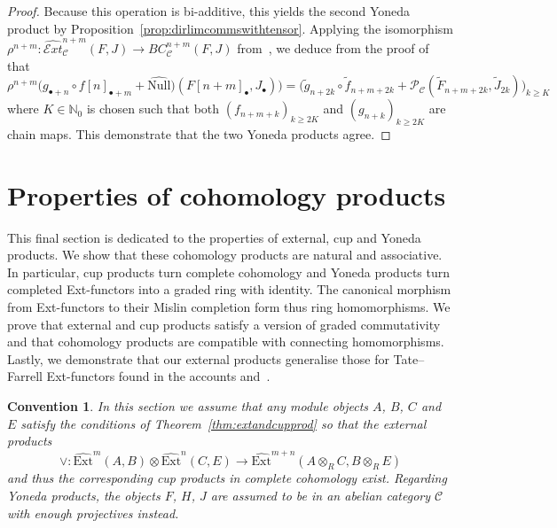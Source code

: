 \documentclass[12pt, a4paper]{article}
\numberwithin{equation}{section}
\newtheorem{conv}[thm]{Convention}
\theoremstyle{empty}
\theoremstyle{nonumberplain}
\newtheorem{proof}{Proof}
\begin{document}
\begin{proof}
Because this operation is bi-additive, this yields the second Yoneda product by Proposition~\ref{prop:dirlimcommswithtensor}. Applying the isomorphism $\rho^{n+m}: \widehat{\mathcal{E}xt}_{\mathcal{C}}^{n+m}(F, J) \rightarrow BC_{\mathcal{C}}^{n+m}(F, J)$ from~\cite[Definition~6.19]{ghe24}, we deduce from the proof of~\cite[Lemma~6.20]{ghe24} that
\[ \rho^{n+m}\big(g_{\bullet+n} \circ f[n]_{\bullet+m}+\widehat{\mathrm{Null}})(F[n+m]_{\bullet}, J_{\bullet})\big) = \big(\widetilde{g}_{n+2k} \circ \widetilde{f}_{n+m+2k}+\mathcal{P}_{\mathcal{C}}(\widetilde{F}_{n+m+2k}, \widetilde{J}_{2k})\big)_{k \geq K} \]
where $K \in \mathbb{N}_0$ is chosen such that both $(f_{n+m+k})_{k \geq 2K}$ and $(g_{n+k})_{k \geq 2K}$ are chain maps. This demonstrate that the two Yoneda products agree.
\end{proof}

\section{Properties of cohomology products}\label{sec:cohomprodpropties}

This final section is dedicated to the properties of external, cup and Yoneda products. We show that these cohomology products are natural and associative. In particular, cup products turn complete cohomology and Yoneda products turn completed Ext-functors into a graded ring with identity. The canonical morphism from Ext-functors to their Mislin completion form thus ring homomorphisms. We prove that external and cup products satisfy a version of graded commutativity and that cohomology products are compatible with connecting homomorphisms. Lastly, we demonstrate that our external products generalise those for Tate--Farrell Ext-functors found in the accounts \cite[p.~110]{ben92} and~\cite[pp.~278--279]{bro82}.

\begin{conv}
In this section we assume that any module objects $A$, $B$, $C$ and $E$ satisfy the conditions of Theorem~\ref{thm:extandcupprod} so that the external products
\[ \vee: \widehat{\mathrm{Ext}}^m(A, B) \otimes \widehat{\mathrm{Ext}}^n(C, E) \rightarrow \widehat{\mathrm{Ext}}^{m+n}(A  \otimes_R C, B \otimes_R E) \]
and thus the corresponding cup products in complete cohomology exist. Regarding Yoneda products, the objects $F$, $H$, $J$ are assumed to be in an abelian category $\mathcal{C}$ with enough projectives instead.
\end{conv}
\end{document}
